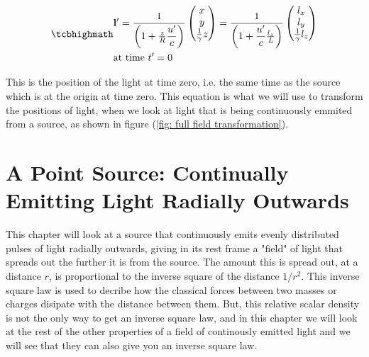 \begin{equation}
	\label{eq: time synced transform}
	\mhl{
		\begin{aligned}
			& \mathbf{l}{'} = \dfrac{1}{\left(1 + \frac{z}{R} \dfrac{u'}{c} \right)}
			\begin{pmatrix}
				x                    \\
				y                    \\
				\frac{1}{{\gamma}} z \\
			\end{pmatrix}
			= \dfrac{1}{\left(1 + \dfrac{u'}{c} \frac{l_z}{L} \right)}
			\begin{pmatrix}
				l_x                    \\
				l_y                    \\
				\frac{1}{{\gamma}} l_z \\
			\end{pmatrix}
			\\
			& \text{at time ${t{'}}=0$ }
		\end{aligned}
	}
\end{equation}


This is the position of the light at time zero, i.e. the same time as the source which is at the origin at time zero. This equation is what we will use to transform the positions of light, when we look at light that is being continuously emmited from a source, as shown in figure (\ref{fig: full field transformation}).



\printbibliography[segment=\therefsegment, heading=subbibliography]

\chapter{A Point Source: Continually Emitting Light Radially Outwards} \label{ch: A Point Source Continually Emitting Light}

This chapter will look at a source that continuously emits evenly distributed pulses of light radially outwards, giving in its rest frame a "field" of light that spreads out the further it is from the source.
The amount this is spread out, at a distance $r$, is proportional to the inverse square of the distance $1/r^2$.
This inverse square law is used to decribe how the classical forces between two masses or charges disipate with the distance between them.
But, this relative scalar density is not the only way to get an inverse square law, and in this chapter we will look at the rest of the other properties of a field of continously emitted light and we will see that they can also give you an inverse square law.

